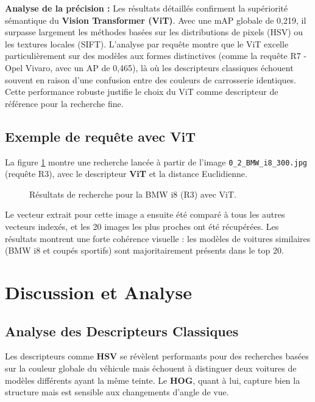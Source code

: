 \documentclass[a4paper,12pt]{report}%
\begin{document}
\noindent \textbf{Analyse de la précision :}
Les résultats détaillés confirment la supériorité sémantique du \textbf{Vision Transformer (ViT)}. Avec une mAP globale de 0,219, il surpasse largement les méthodes basées sur les distributions de pixels (HSV) ou les textures locales (SIFT). L'analyse par requête montre que le ViT excelle particulièrement sur des modèles aux formes distinctives (comme la requête R7 - Opel Vivaro, avec un AP de 0,465), là où les descripteurs classiques échouent souvent en raison d'une confusion entre des couleurs de carrosserie identiques. Cette performance robuste justifie le choix du ViT comme descripteur de référence pour la recherche fine.

\section{Exemple de requête avec ViT}
La figure \ref{fig:exemple_vit} montre une recherche lancée à partir de l’image \texttt{0\_2\_BMW\_i8\_300.jpg} (requête R3), avec le descripteur \textbf{ViT} et la distance Euclidienne.

\begin{figure}[H]
    \centering
    \caption{Résultats de recherche pour la BMW i8 (R3) avec ViT.}
    \label{fig:exemple_vit}
\end{figure}

Le vecteur extrait pour cette image a ensuite été comparé à tous les autres vecteurs indexés, et les 20 images les plus proches ont été récupérées. Les résultats montrent une forte cohérence visuelle : les modèles de voitures similaires (BMW i8 et coupés sportifs) sont majoritairement présents dans le top 20.

\chapter{Discussion et Analyse}
\section{Analyse des Descripteurs Classiques}
Les descripteurs comme \textbf{HSV} se révèlent performants pour des recherches basées sur la couleur globale du véhicule mais échouent à distinguer deux voitures de modèles différents ayant la même teinte. Le \textbf{HOG}, quant à lui, capture bien la structure mais est sensible aux changements d'angle de vue.
\end{document}
